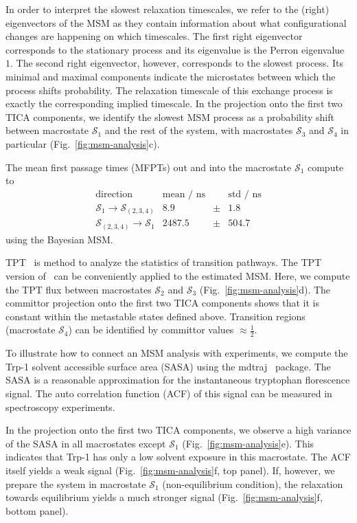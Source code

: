 \documentclass[9pt,tutorial]{livecoms}
\begin{document}
In order to interpret the slowest relaxation timescales, we refer to the (right) eigenvectors of the MSM as they contain information about what configurational changes are happening on which timescales.
The first right eigenvector corresponds to the stationary process and its eigenvalue is the Perron eigenvalue $1$.
The second right eigenvector, however, corresponds to the slowest process.
Its minimal and maximal components indicate the microstates between which the process shifts probability.
The relaxation timescale of this exchange process is exactly the corresponding implied timescale.
In the projection onto the first two TICA components, we identify the slowest MSM process as a probability shift between macrostate $\mathcal{S}_1$ and the rest of the system, with macrostates $\mathcal{S}_3$ and $\mathcal{S}_4$ in particular (Fig.~\ref{fig:msm-analysis}c).

The mean first passage times (MFPTs) out and into the macrostate $\mathcal{S}_1$ compute to
\[ \begin{array}{crcr}
\textrm{direction} & \textrm{mean / ns} && \textrm{std / ns} \\
\hline
\mathcal{S}_1 \to \mathcal{S}_{(2,3,4)} & 8.9 & \pm & 1.8 \\
\mathcal{S}_{(2,3,4)} \to \mathcal{S}_1 & 2487.5 & \pm &  504.7
\end{array}\]
using the Bayesian MSM.

TPT~\cite{weinan-tpt,metzner-msm-tpt} is method to analyze the statistics of transition pathways. The TPT version of~\cite{noe-folding-pathways} can be conveniently applied to the estimated MSM. Here, we compute the TPT flux between macrostates $\mathcal{S}_2$ and $\mathcal{S}_3$ (Fig.~\ref{fig:msm-analysis}d).
The committor projection onto the first two TICA components shows that it is constant within the metastable states defined above.
Transition regions (macrostate $\mathcal{S}_4$) can be identified by committor values $\approx \frac{1}{2}$.

To illustrate how to connect an MSM analysis with experiments, we compute the Trp-1 solvent accessible surface area (SASA) using the mdtraj~\cite{mdtraj} package.
The SASA is a reasonable approximation for the instantaneous tryptophan florescence signal.
The auto correlation function (ACF) of this signal can be measured in spectroscopy experiments.

In the projection onto the first two TICA components, we observe a high variance of the SASA in all macrostates except $\mathcal{S}_1$ (Fig.~\ref{fig:msm-analysis}e).
This indicates that Trp-1 has only a low solvent exposure in this macrostate.
The ACF itself yields a weak signal (Fig.~\ref{fig:msm-analysis}f, top panel).
If, however, we prepare the system in macrostate $\mathcal{S}_1$ (non-equilibrium condition), the relaxation towards equilibrium yields a much stronger signal (Fig.~\ref{fig:msm-analysis}f, bottom panel).
\end{document}
